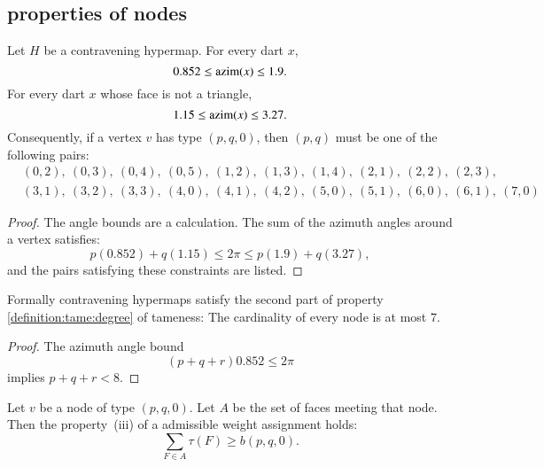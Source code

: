 {\subsection{properties of nodes}



\begin{lemma} \label{lemma:0.852}
Let $H$ be a contravening
hypermap. For every dart $x$,
    $$0.852\le {\operatorname{azim}}(x)\le 1.9.$$
For every dart $x$ whose face is not a triangle, 
    $$1.15\le{\operatorname{azim}}(x)\le 3.27.$$
Consequently, if a vertex $v$ has type $(p,q,0)$, then $(p,q)$
must be one of the following pairs:
$$
\begin{array}{lll}
&(0,2),~(0,3),~(0,4),~(0,5),~(1,2),~(1,3),~(1,4),~(2,1),~(2,2),~(2,3),\\
&(3,1),~(3,2),~(3,3),~(4,0),~(4,1),~(4,2),~(5,0),~(5,1),~(6,0),~(6,1),~(7,0)
\end{array}
$$
\end{lemma}
 
\begin{proof}
The angle bounds are a calculation.  The sum of the azimuth angles
around a vertex satisfies:
$$
  p (0.852) + q (1.15) \le 2\pi \le p (1.9) + q (3.27),
$$
and the pairs satisfying these constraints are listed.
\end{proof}

\begin{lemma}
Formally contravening hypermaps satisfy the second part of property
\ref{definition:tame:degree} of tameness: The cardinality of every
node is at most $7$.
\end{lemma}

\begin{proof}  The azimuth angle bound
$$
 (p+q+r) 0.852 \le 2\pi
$$
implies $p+q+r < 8$.
\end{proof}




\begin{lemma} 
Let $v$ be a node of type $(p,q,0)$.  Let $A$ be the set of faces meeting that node.  Then the property~(iii) of a admissible weight assignment holds:
$$
\sum_{F\in A} \tau(F) \ge  b(p,q,0).
$$
\end{lemma}

}
